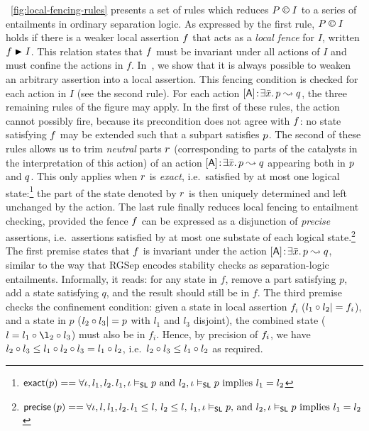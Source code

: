 \fig~\ref{fig:local-fencing-rules} presents a set of
rules which reduces  $P \containI I$ to a series of entailments in
ordinary separation logic. As expressed by the first rule,
$P \containI I$ holds if there is a weaker local assertion $\lass{F}$
that acts as a \emph{local fence} for $I$, written 
$\lass{F}\strictfences I$. This relation states that  $\lass{F}$
must be invariant under all actions of $I$ and must confine the
actions in $f$.  In~\cite{colosl-tr14},
we show that it is always possible to weaken an arbitrary assertion into a local assertion. This fencing condition is
checked for each action in $I$ (see the second rule). For each action
$\interAss{[\token{A}]}{\bar x}{\lass{P}}{\lass{Q}}$, the three remaining rules of the figure may
apply. In the first of these rules, the action cannot possibly fire,
because its precondition does not agree with $\lass{F}$: no state
satisfying $\lass{F}$ may be extended such that a subpart satisfies
$\lass{P}$. 
The second of these rules allows us to trim \emph{neutral} parts
$\lass{R}$ (corresponding to parts of the catalysts in the
interpretation of this action) of an action
$\interAss{[\token{A}]}{\bar x}{\lass{P}}{\lass{Q}}$ appearing both in
$\lass{P}$ and $\lass{Q}$. This only applies when $\lass{R}$ is
\emph{exact}, i.e.\ satisfied by at most one logical
state:\footnote{$\textsf{exact}(p) == \forall \iota, l_1, l_2.\, l_1, \iota \mathrel{\vDash_{\mathsf{SL}}}
  p\text{ and }l_2, \iota \mathrel{\vDash_{\mathsf{SL}}} p\text{ implies } l_1 = l_2$} the
part of the state denoted by $\lass{R}$ is then uniquely determined
and left unchanged by the action.  The last rule finally reduces local
fencing to entailment checking, provided the fence $\lass{F}$ can be
expressed as a disjunction of \emph{precise} assertions,
i.e.\ assertions satisfied by at most one substate of each logical
state.\footnote{$\textsf{precise} \left( p \right) == \forall \iota, l, l_1, l_2.\, l_1\leq
  l\text{, }l_2\leq l\text{, }l_1, \iota \mathrel{\vDash_{\mathsf{SL}}} p\text{, and }l_2,
  \iota \mathrel{\vDash_{\mathsf{SL}}} p \text{ implies } l_1 = l_2$} The first premise states
that $\lass{F}$ is invariant under the action
$\interAss{[\token{A}]}{\bar x}{\lass{P}}{\lass{Q}}$, similar to the
way that RGSep encodes stability checks as separation-logic
entailments. Informally, it reads: for any state in $f$, remove a part
satisfying $p$, add a state satisfying $q$, and the result should
still be in $f$. The third premise checks the confinement condition:
given a state in local assertion $f_i$ ($l_1\composeL l_2|=
\lass{F}_i$), and a state in $p$ ($l_2 \circ l_3 |= p$ with $l_1$
and $l_3 $ disjoint), the combined state ($l = l_1 \composeL \l_2
\composeL l_3$) must also be in $f_i$. Hence, by precision of
$\lass{F}_i$, we have $l_2\circ l_3\leq l_1\circ l_2\circ
l_3 = l_1\circ l_2$, i.e.\ $l_2\circ l_3 \leq l_1\circ
l_2$ as required.



